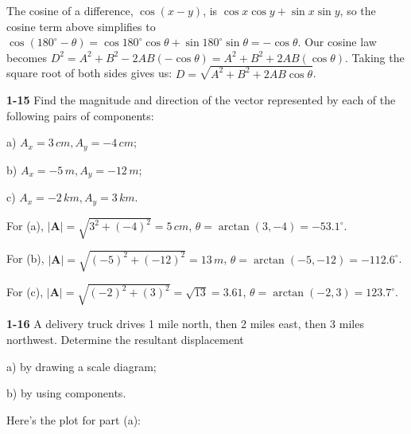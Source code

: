 \documentclass{amsart}
\begin{document}
The cosine of a difference, $\cos (x-y)$, is $\cos x \cos y + \sin x \sin y$,
so the cosine term above simplifies to
$\cos (180^\circ - \theta) = \cos 180^\circ \cos \theta + \sin 180^\circ \sin \theta = - \cos \theta$.
Our cosine law becomes $D^2 = A^2 + B^2 - 2 A B (-\cos \theta) = A^2 + B^2 + 2 A B (\cos \theta)$.
Taking the square root of both sides gives us: $D = \sqrt{A^2 + B^2 + 2 A B \cos \theta}$.

\textbf{1-15} Find the magnitude and direction of the vector represented by each of the following pairs of components:

a) $A_x = 3\,cm, A_y = -4\,cm$;

b) $A_x = -5\,m, A_y = -12\,m$;

c) $A_x = -2\,km, A_y = 3\,km$.

For (a), $|\textbf{A}| = \sqrt{3^2 + (-4)^2} = 5\,cm$, $\theta = \arctan(3,-4) = -53.1^\circ$.

For (b), $|\textbf{A}| = \sqrt{(-5)^2 + (-12)^2} = 13\,m$, $\theta = \arctan(-5,-12) = -112.6^\circ$.

For (c), $|\textbf{A}| = \sqrt{(-2)^2 + (3)^2} = \sqrt{13} = 3.61$, $\theta = \arctan(-2,3) = 123.7^\circ$.

\textbf{1-16} A delivery truck drives 1 mile north, then 2 miles east, then 3 miles northwest.  Determine the resultant displacement

a) by drawing a scale diagram;

b) by using components.

Here's the plot for part (a):
\end{document}
